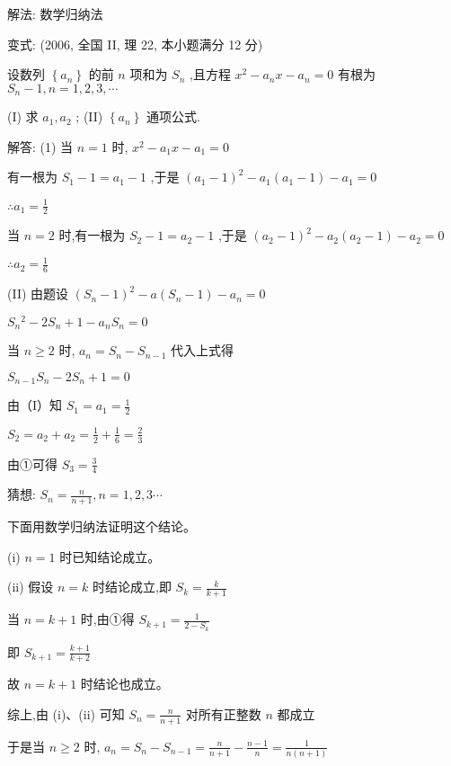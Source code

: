 \documentclass[10pt,cn]{elegantbook}
\begin{document}
解法: 数学归纳法

变式: (2006, 全国 II, 理 22, 本小题满分 12 分)

设数列 \(\left\{ {a}_{n}\right\}\) 的前 \(n\) 项和为 \({S}_{n}\) ,且方程 \({x}^{2} - {a}_{n}x - {a}_{n} = 0\) 有根为 \({S}_{n} - 1,n = 1,2,3,\cdots\)

(I) 求 \({a}_{1},{a}_{2}\) ; (II) \(\left\{ {a}_{n}\right\}\) 通项公式.

解答: (1) 当 \(n = 1\) 时, \({x}^{2} - {a}_{1}x - {a}_{1} = 0\)

有一根为 \({S}_{1} - 1 = {a}_{1} - 1\) ,于是 \({\left( {a}_{1} - 1\right) }^{2} - {a}_{1}\left( {{a}_{1} - 1}\right) - {a}_{1} = 0\)

\(\therefore {a}_{1} = \frac{1}{2}\)

当 \(n = 2\) 时,有一根为 \({S}_{2} - 1 = {a}_{2} - 1\) ,于是 \({\left( {a}_{2} - 1\right) }^{2} - {a}_{2}\left( {{a}_{2} - 1}\right) - {a}_{2} = 0\)

\(\therefore {a}_{2} = \frac{1}{6}\)

(II) 由题设 \({\left( {S}_{n} - 1\right) }^{2} - a\left( {{S}_{n} - 1}\right) - {a}_{n} = 0\)

\({S}_{n}{}^{2} - 2{S}_{n} + 1 - {a}_{n}{S}_{n} = 0\)

当 \(n \geq 2\) 时, \({a}_{n} = {S}_{n} - {S}_{n - 1}\) 代入上式得

\({S}_{n - 1}{S}_{n} - 2{S}_{n} + 1 = 0\)

由（I）知 \({S}_{1} = {a}_{1} = \frac{1}{2}\)

\({S}_{2} = {a}_{2} + {a}_{2} = \frac{1}{2} + \frac{1}{6} = \frac{2}{3}\)

由①可得 \({S}_{3} = \frac{3}{4}\)

猜想: \({S}_{n} = \frac{n}{n + 1},n = 1,2,3\cdots\)

下面用数学归纳法证明这个结论。

(i) \(n = 1\) 时已知结论成立。

(ii) 假设 \(n = k\) 时结论成立,即 \({S}_{k} = \frac{k}{k + 1}\)

当 \(n = k + 1\) 时,由①得 \({S}_{k + 1} = \frac{1}{2 - {S}_{k}}\)

即 \({S}_{k + 1} = \frac{k + 1}{k + 2}\)

故 \(n = k + 1\) 时结论也成立。

综上,由 (i)、(ii) 可知 \({S}_{n} = \frac{n}{n + 1}\) 对所有正整数 \(n\) 都成立

于是当 \(n \geq 2\) 时, \({a}_{n} = {S}_{n} - {S}_{n - 1} = \frac{n}{n + 1} - \frac{n - 1}{n} = \frac{1}{n\left( {n + 1}\right) }\)
\end{document}
